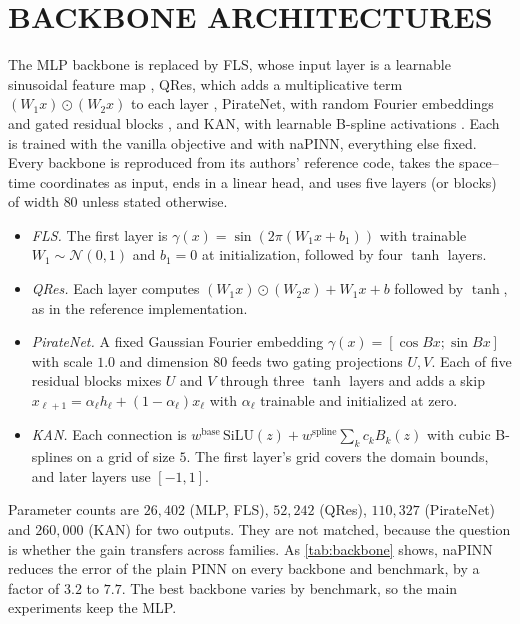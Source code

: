 \documentclass[twoside]{article}
\begin{document}
\section{BACKBONE ARCHITECTURES}
\label{app:backbone}

The MLP backbone is replaced by FLS, whose input layer is a learnable sinusoidal
feature map \citep{Wong2022FLS}, QRes, which adds a multiplicative term
$(W_1 x)\odot(W_2 x)$ to each layer \citep{Bu2021QRes}, PirateNet, with random
Fourier embeddings and gated residual blocks \citep{Wang2024PirateNet}, and KAN,
with learnable B-spline activations \citep{Liu2024KAN}. Each is trained with the
vanilla objective and with naPINN, everything else fixed. Every backbone is
reproduced from its authors' reference code, takes the space--time coordinates as input, ends in a
linear head, and uses five layers (or blocks) of width $80$ unless stated otherwise.
\begin{itemize}
\item \emph{FLS.} The first layer is $\gamma(x) = \sin(2\pi(W_1x + b_1))$ with
trainable $W_1 \sim \mathcal{N}(0, 1)$ and $b_1 = 0$ at initialization,
followed by four $\tanh$ layers.
\item \emph{QRes.} Each layer computes $(W_1x)\odot(W_2x) + W_1x + b$
followed by $\tanh$, as in the reference implementation.
\item \emph{PirateNet.} A fixed Gaussian Fourier embedding
$\gamma(x) = [\cos Bx; \sin Bx]$ with scale $1.0$ and dimension $80$ feeds two
gating projections $U, V$. Each of five residual blocks mixes $U$ and $V$
through three $\tanh$ layers and adds a skip $x_{\ell+1} = \alpha_\ell h_\ell +
(1-\alpha_\ell)x_\ell$ with $\alpha_\ell$ trainable and initialized at zero.
\item \emph{KAN.} Each connection is $w^{\mathrm{base}}\,\mathrm{SiLU}(z) +
w^{\mathrm{spline}}\sum_k c_k B_k(z)$ with cubic B-splines on a grid of size
$5$. The first layer's grid covers the domain bounds, and later layers use
$[-1,1]$.
\end{itemize}
Parameter counts are $26{,}402$ (MLP, FLS), $52{,}242$ (QRes), $110{,}327$
(PirateNet) and $260{,}000$ (KAN) for two outputs. They are not matched,
because the question is whether the gain transfers across families. As
\cref{tab:backbone} shows, naPINN reduces the error of the plain PINN on every
backbone and benchmark, by a factor of $3.2$ to $7.7$. The best backbone varies by benchmark, so the main
experiments keep the MLP.
\end{document}
